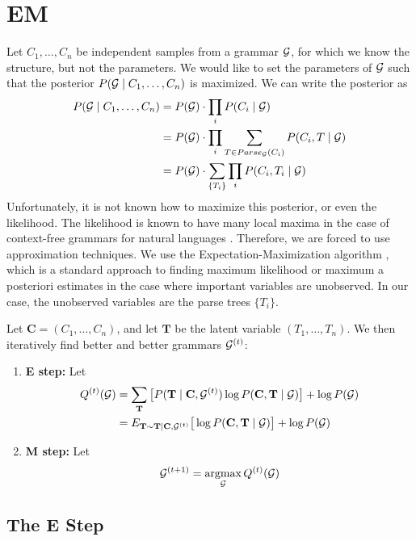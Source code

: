 \documentclass{article}
\begin{document}
\section{EM}

Let $C_1,\dots, C_n$ be independent samples from a grammar ${\mathcal G}$, for
which we know the structure, but not the parameters. We would like to
set the parameters of ${\mathcal G}$ such that the posterior $P({\mathcal G}\mid
C_1,\dots,C_n)$ is maximized. We can write the posterior as
\begin{align*}
  P({\mathcal G}\mid C_1,\dots, C_n) &= P({\mathcal G}) \cdot \prod_i P(C_i\mid {\mathcal G})\\
  &= P({\mathcal G}) \cdot \prod_i \sum_{T\in Parse_{{\mathcal G}}(C_i)}P(C_i, T \mid {\mathcal G})\\
  &= P({\mathcal G}) \cdot \sum_{\{T_i\}}\prod_i P(C_i, T_i \mid {\mathcal G})\\
\end{align*}
Unfortunately, it is not known how to maximize this posterior, or even
the likelihood. The likelihood is known to have many local maxima in
the case of context-free grammars for natural languages
\cite{charniak}. Therefore, we are forced to use approximation
techniques. We use the Expectation-Maximization algorithm \cite{em},
which is a standard approach to finding maximum likelihood or maximum
a posteriori estimates in the case where important variables are
unobserved. In our case, the unobserved variables are the parse trees
$\{T_i\}$.

Let $\mathbf{C} = (C_1,\dots,C_n)$, and let $\mathbf{T}$ be the latent
variable $(T_1,\dots,T_n)$. We then iteratively find better and better
grammars ${\mathcal G}^{(t)}$:
\begin{enumerate}
\item \textbf{E step:} Let 
  \begin{align*}
Q^{(t)}({\mathcal G}) &= \sum_{\mathbf{T}} \big[P(\mathbf{T}\mid \mathbf{C},
{\mathcal G}^{(t)}) \log P(\mathbf{C},\mathbf{T}\mid {\mathcal G}) \big] + \log
P({\mathcal G})\\
&= E_{\mathbf{T} \sim \mathbf{T} | \mathbf{C}, {\mathcal G}^{(t)}}\big[\log
P(\mathbf{C},\mathbf{T}\mid {\mathcal G}) \big] + \log P({\mathcal G})
  \end{align*}
\item \textbf{M step:} Let
$$ {\mathcal G}^{(t+1)} = \operatorname*{argmax}_{{\mathcal G}} Q^{(t)}({\mathcal G})$$
\end{enumerate}

\subsection{The E Step}
\end{document}
